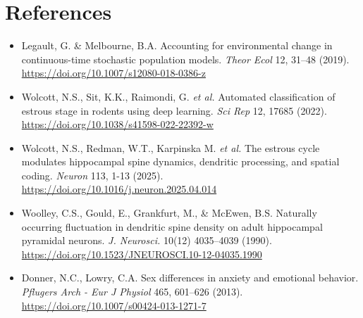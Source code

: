 \documentclass[11pt,letterpaper, onecolumn]{exam}
\begin{document}
\section*{References}
\begin{itemize}[label={}]
\item Legault, G. \& Melbourne, B.A. Accounting for environmental change in continuous-time stochastic population models. \textit{Theor Ecol} 12, 31--48 (2019). \url{https://doi.org/10.1007/s12080-018-0386-z}
\item Wolcott, N.S., Sit, K.K., Raimondi, G. \textit{et al.} Automated classification of estrous stage in rodents using deep learning. \textit{Sci Rep} 12, 17685 (2022). \url{https://doi.org/10.1038/s41598-022-22392-w}
\item Wolcott, N.S., Redman, W.T., Karpinska M. \textit{et al.} The estrous cycle modulates hippocampal spine dynamics, dendritic processing, and spatial coding. \textit{Neuron} 113, 1-13 (2025). \url{https://doi.org/10.1016/j.neuron.2025.04.014}
\item Woolley, C.S., Gould, E., Grankfurt, M., \& McEwen, B.S. Naturally occurring fluctuation in dendritic spine density on adult hippocampal pyramidal neurons. \textit{J. Neurosci.} 10(12) 4035--4039 (1990). \url{https://doi.org/10.1523/JNEUROSCI.10-12-04035.1990}
\item Donner, N.C., Lowry, C.A. Sex differences in anxiety and emotional behavior. \textit{Pflugers Arch - Eur J Physiol} 465, 601–626 (2013). \url{https://doi.org/10.1007/s00424-013-1271-7}
\end{itemize}
\end{document}
